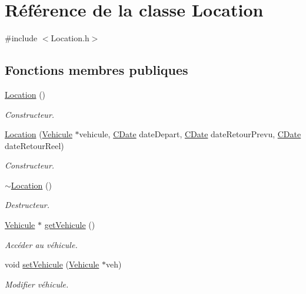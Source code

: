 \hypertarget{class_location}{
\section{Référence de la classe Location}
\label{class_location}
}


{\ttfamily \#include $<$Location.h$>$}

\subsection*{Fonctions membres publiques}
\begin{DoxyCompactItemize}
\item 
\hyperlink{class_location_a87790c14997fd8cdd12080c78c9794bb}{Location} ()
\begin{DoxyCompactList}\small\item\em Constructeur. \item\end{DoxyCompactList}\item 
\hyperlink{class_location_a5a09ef0b7e8bd346553572e4a17e916a}{Location} (\hyperlink{class_vehicule}{Vehicule} $\ast$vehicule, \hyperlink{class_c_date}{CDate} dateDepart, \hyperlink{class_c_date}{CDate} dateRetourPrevu, \hyperlink{class_c_date}{CDate} dateRetourReel)
\begin{DoxyCompactList}\small\item\em Constructeur. \item\end{DoxyCompactList}\item 
\hyperlink{class_location_af5be2c6550bbd96137cbb3144ec3c529}{$\sim$Location} ()
\begin{DoxyCompactList}\small\item\em Destructeur. \item\end{DoxyCompactList}\item 
\hyperlink{class_vehicule}{Vehicule} $\ast$ \hyperlink{class_location_a3f130f10a4a558d6b792b1e538e9fb40}{getVehicule} ()
\begin{DoxyCompactList}\small\item\em Accéder au véhicule. \item\end{DoxyCompactList}\item 
void \hyperlink{class_location_a66eaf6883a88c65a6281ccf111db3c03}{setVehicule} (\hyperlink{class_vehicule}{Vehicule} $\ast$veh)
\begin{DoxyCompactList}\small\item\em Modifier véhicule. \item\end{DoxyCompactList}\item 

\end{DoxyCompactItemize}

